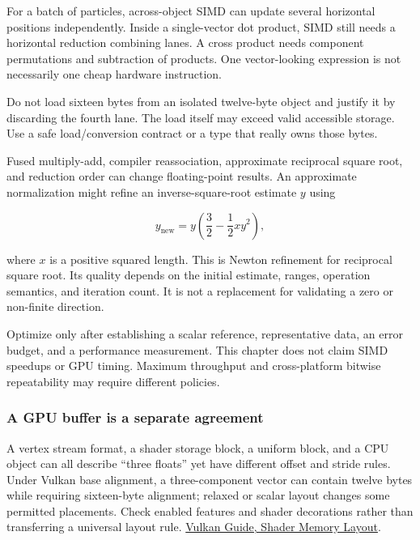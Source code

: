 For a batch of particles, across-object SIMD can update several horizontal positions independently. Inside a single-vector dot product, SIMD still needs a horizontal reduction combining lanes. A cross product needs component permutations and subtraction of products. One vector-looking expression is not necessarily one cheap hardware instruction.

Do not load sixteen bytes from an isolated twelve-byte object and justify it by discarding the fourth lane. The load itself may exceed valid accessible storage. Use a safe load/conversion contract or a type that really owns those bytes.

Fused multiply-add, compiler reassociation, approximate reciprocal square root, and reduction order can change floating-point results. An approximate normalization might refine an inverse-square-root estimate \(y\) using

\[
y_{\mathrm{new}}=y\left(\frac32-\frac12xy^2\right),
\]

where \(x\) is a positive squared length. This is Newton refinement for reciprocal square root. Its quality depends on the initial estimate, ranges, operation semantics, and iteration count. It is not a replacement for validating a zero or non-finite direction.

Optimize only after establishing a scalar reference, representative data, an error budget, and a performance measurement. This chapter does not claim SIMD speedups or GPU timing. Maximum throughput and cross-platform bitwise repeatability may require different policies.

\subsubsection{A GPU buffer is a separate agreement}\label{02-foundations-ii-ch037-a-gpu-buffer-is-a-separate-agreement}

\hypertarget{02-foundations-ii-ch037-a-gpu-buffer-is-a-separate-agreement}{}

A vertex stream format, a shader storage block, a uniform block, and a CPU object can all describe ``three floats'' yet have different offset and stride rules. Under Vulkan base alignment, a three-component vector can contain twelve bytes while requiring sixteen-byte alignment; relaxed or scalar layout changes some permitted placements. Check enabled features and shader decorations rather than transferring a universal  layout rule. \href{https://docs.vulkan.org/guide/latest/shader_memory_layout.html}{Vulkan Guide, Shader Memory Layout}.

